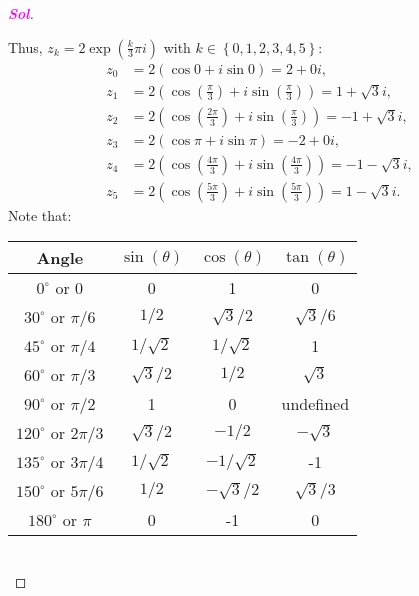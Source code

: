 \documentclass{article}
\theoremstyle{definition}
\newcommand{\set}[1]{\left\{#1\right\}}
\newcommand{\of}[1]{\left( #1 \right)}
\newcommand{\sol}{\textcolor{magenta}{\bf Sol}}
\begin{document}
\begin{enumerate}
\begin{proof}[\sol]
\begin{center}
			\end{center}
			Thus, $z_k=2\exp\of{\frac{k}{3}\pi i}$ with $k\in\set{0,1,2,3,4,5}:$\begin{align*}
			z_0&=2\of{\cos 0+i\sin 0}=2+0i,\\
			z_1&=2\of{\cos\of{\frac{\pi}{3}}+i\sin\of{\frac{\pi}{3}}}=1+\sqrt{3}i,\\
			z_2&=2\of{\cos\of{\frac{2\pi}{3}}+i\sin\of{\frac{\pi}{3}}}=-1+\sqrt{3}i,\\
			z_3&=2\of{\cos\pi+i\sin\pi}=-2+0i,\\
			z_4&=2\of{\cos\of{\frac{4\pi}{3}}+i\sin\of{\frac{4\pi}{3}}}=-1-\sqrt{3}i,\\
			z_5&=2\of{\cos\of{\frac{5\pi}{3}}+i\sin\of{\frac{5\pi}{3}}}=1-\sqrt{3}i.
			\end{align*}
			Note that: \begin{table}[ht!]
				\centering
				\begin{tabular}{c||c|c|c}
					\toprule
					Angle & $\sin(\theta)$ & $\cos(\theta)$ & $\tan(\theta)$ \\
					\midrule
					$0^\circ$ or $0$ & 0 & 1 & 0 \\
					$30^\circ$ or ${\pi}/{6}$ & ${1}/{2}$ & ${\sqrt{3}}/{2}$ & ${\sqrt{3}}/{6}$ \\
					$45^\circ$ or ${\pi}/{4}$ & ${1}/{\sqrt{2}}$ & ${1}/{\sqrt{2}}$ & 1 \\
					$60^\circ$ or ${\pi}/{3}$ & ${\sqrt{3}}/{2}$ & ${1}/{2}$ & $\sqrt{3}$ \\
					$90^\circ$ or ${\pi}/{2}$ & 1 & 0 & undefined \\
					$120^\circ$ or ${2\pi}/{3}$ & ${\sqrt{3}}/{2}$ & $-{1}/{2}$ & $-\sqrt{3}$ \\
					$135^\circ$ or ${3\pi}/{4}$ & ${1}/{\sqrt{2}}$ & $-{1}/{\sqrt{2}}$ & -1 \\
					$150^\circ$ or ${5\pi}/{6}$ & ${1}/{2}$ & $-{\sqrt{3}}/{2}$ & ${\sqrt{3}}/{3}$ \\
					$180^\circ$ or $\pi$ & 0 & -1 & 0 \\
					\bottomrule
				\end{tabular}
			\end{table}\\
		\end{proof}
		\vspace{8pt}

\end{enumerate}
\end{document}
